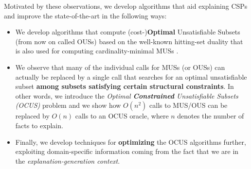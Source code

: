 Motivated by these observations, we develop algorithms that aid explaining CSPs and improve the state-of-the-art in the following ways: 
\begin{itemize}
 \item We develop algorithms that compute (cost-)\textbf{Optimal} Unsatisfiable Subsets (from now on called OUSs) based on the well-known hitting-set duality that is also used for computing cardinality-minimal MUSs \cite{ignatiev2015smallest}.
\item We observe that many of the individual calls for MUSs (or OUSs) can actually be replaced by a single call that searches for an optimal unsatisfiable subset \textbf{among subsets satisfying certain structural constraints}. In other words, we introduce the \emph{Optimal \textbf{Constrained} Unsatisfiable Subsets (OCUS)} problem and we show how $O(n^2)$ calls to MUS/OUS can be replaced by $O(n)$ calls to an OCUS oracle, where $n$ denotes the number of facts to explain. 
\item Finally, we develop techniques for \textbf{optimizing} the OCUS algorithms further, exploiting domain-specific information coming from the fact that we are in the  \emph{explanation-generation context}. %
% 
% 
\end{itemize}



